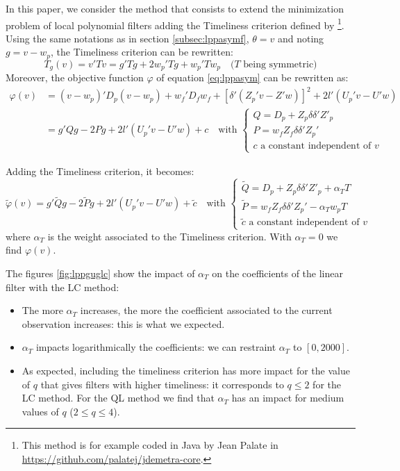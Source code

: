 \documentclass[
  12pt,
  ,
  a4paper]{article}
\newcommand\1{\mathds{1}}
\begin{document}
In this paper, we consider the method that consists to extend the minimization problem of local polynomial filters adding the Timeliness criterion defined by \textcite{ch15HBSA}\footnote{This method is for example coded in Java by Jean Palate in \url{https://github.com/palatej/jdemetra-core}.}.
Using the same notations as in section \ref{subsec:lppasymf}, \(\theta=v\) and noting \(g=v-w_p\), the Timeliness criterion can be rewritten:
\[
T_g(v)=v'Tv=g'Tg+2w_p'Tg+w_p'Tw_p
\quad(T\text{ being symmetric)}
\]
Moreover, the objective function \(\varphi\) of equation \eqref{eq:lppasym} can be rewritten as:
\begin{align*}
\varphi(v)&=(v-w_{p})'D_{p}(v-w_{p})+
  w_{f}'D_{f}w_{f}+
  [\delta'(Z_{p}'v-Z'w)]^{2}+
2l'(U_{p}'v-U'w)\\
&=g'Qg-2Pg+2l'(U_{p}'v-U'w)+c\quad\text{with }
\begin{cases}
Q=D_p+Z_p\delta\delta'Z'_p \\
P=w_fZ_f\delta\delta'Z_p'\\
c\text{ a constant independent of }v
\end{cases}
\end{align*}

Adding the Timeliness criterion, it becomes:
\[
\widetilde\varphi(v)=g'\widetilde Qg-
2\widetilde Pg+2l'(U_{p}'v-U'w)+
\widetilde c\quad\text{with }
\begin{cases}
\widetilde Q=D_p+Z_p\delta\delta'Z'_p +\alpha_TT\\
\widetilde P=w_fZ_f\delta\delta'Z_p'-\alpha_Tw_pT\\
\widetilde c\text{ a constant independent of }v
\end{cases}
\]
where \(\alpha_T\) is the weight associated to the Timeliness criterion. With \(\alpha_T=0\) we find \(\varphi(v)\).

The figures \ref{fig:lppguglc} show the impact of \(\alpha_T\) on the coefficients of the linear filter with the LC method:

\begin{itemize}
\item
  The more \(\alpha_T\) increases, the more the coefficient associated to the current observation increases: this is what we expected.
\item
  \(\alpha_T\) impacts logarithmically the coefficients: we can restraint \(\alpha_T\) to \([0,2000]\).
\item
  As expected, including the timeliness criterion has more impact for the value of \(q\) that gives filters with higher timeliness: it corresponds to \(q\leq2\) for the LC method. For the QL method we find that \(\alpha_T\) has an impact for medium values of \(q\) (\(2\leq q\leq4\)).
\end{itemize}
\end{document}
